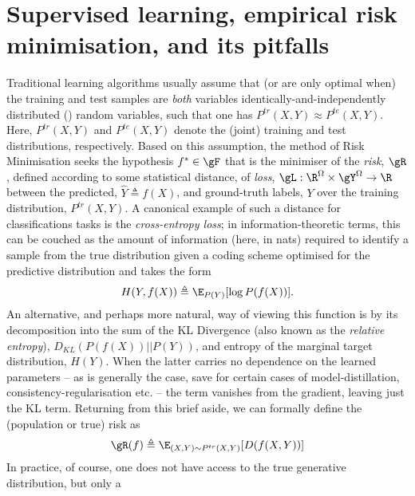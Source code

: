\section{Supervised learning, empirical risk minimisation, and its pitfalls}\label{sec:iid}
%
Traditional learning algorithms usually assume  that (or are only optimal when) the training and
test samples are \emph{both} variables identically-and-independently distributed (\iid{}) random
variables, such that one has \( P^{tr}(X, Y) \approx P^{te}(X, Y) \). 
%
Here, \( P^{tr}(X, Y) \) and \( P^{te}(X, Y) \) denote the (joint) training and test distributions,
respectively.
%
Based on this assumption, the method of Risk Minimisation seeks the hypothesis \( f^\ast \in \gF \)
that is the minimiser of the \emph{risk}, $\gR$, defined according to some statistical distance, of
\emph{loss}, \( \gL: \R^\Omega \times \gY^\Omega \to \R \) between the predicted, \(\hat{Y}
\triangleq f(X) \), and ground-truth labels, \(Y\) over the training distribution, \(P^{tr}(X,
Y)\). 
%
A canonical example of such a distance for classifications tasks is the \emph{cross-entropy loss};
in information-theoretic terms, this can be couched as the amount of information (here, in nats)
required to identify a sample from the true distribution given a coding scheme optimised for the
predictive distribution and takes the form
%
\begin{equation}
    H(Y, f(X)) \triangleq \E_{P(Y)}[ \log P(f(X)) ].
\end{equation}
%
An alternative, and perhaps more natural, way of viewing this function is by its decomposition into
the sum of the \ac{KL} Divergence (also known as the \emph{relative entropy}),
\(D_{KL}(P(f(X))||P(Y))\), and entropy of the marginal target distribution, \(H(Y)\). 
%
When the latter carries no dependence on the learned parameters -- as is generally the case, save
for certain cases of model-distillation, consistency-regularisation etc. -- the term vanishes from
the gradient, leaving just the KL term.
%
Returning from this brief aside, we can formally define the (population or true) risk as
%
\begin{equation}\label{eq:pop_risk} \gR (f) \triangleq \E_{ (X, Y) \sim P^{tr}(X, Y) } [ D ( f(X,
    Y) )]
\end{equation}
%
In practice, of course, one does not have access to the true generative distribution, but only a
